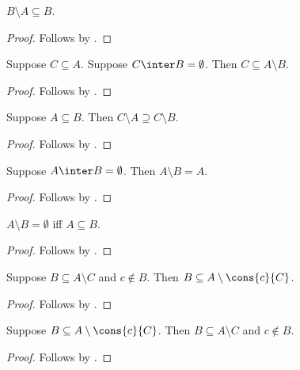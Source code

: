 \begin{proposition}\label{setminus_subseteq}
    $B\setminus A\subseteq B$.
\end{proposition}
\begin{proof}
    Follows by .
\end{proof}

\begin{proposition}\label{subseteq_setminus}
    Suppose $C\subseteq A$.
    Suppose $C\inter B = \emptyset$.
    Then $C\subseteq A\setminus B$.
\end{proposition}
\begin{proof}
    Follows by .
\end{proof}


\begin{proposition}\label{subseteq_implies_setminus_supseteq}
    Suppose $A\subseteq B$.
    Then $C\setminus A\supseteq C\setminus B$.
\end{proposition}
\begin{proof}
    Follows by .
\end{proof}

\begin{proposition}\label{setminus_absorb_right}
    Suppose $A\inter B = \emptyset$.
    Then $A\setminus B = A$.
\end{proposition}
\begin{proof}
    Follows by .
\end{proof}

\begin{proposition}\label{setminus_eq_emptyset_iff_subseteq}
    $A\setminus B = \emptyset$ iff $A\subseteq B$.
\end{proposition}
\begin{proof}
    Follows by .
\end{proof}

\begin{proposition}\label{subseteq_setminus_cons_intro}
    Suppose $B\subseteq A\setminus C$ and $c\notin B$. Then $B\subseteq A\setminus\cons{c}{C}$.
\end{proposition}
\begin{proof}
    Follows by .
\end{proof}

\begin{proposition}\label{subseteq_setminus_cons_elim}
    Suppose $B\subseteq A\setminus\cons{c}{C}$. Then $B\subseteq A\setminus C$ and $c\notin B$.
\end{proposition}
\begin{proof}
    Follows by .
\end{proof}

